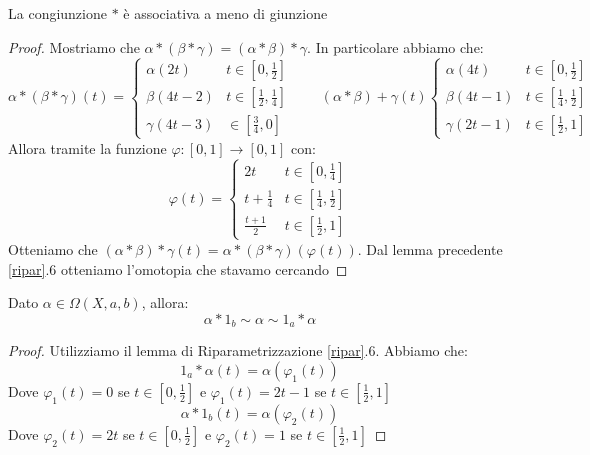 \documentclass[11pt,a4paper,twoside]{article}
\theoremstyle{definition}
\begin{document}
\begin{prop}{}{}\label{prop1}
	La congiunzione $*$ è associativa a meno di giunzione
\end{prop}

\begin{proof}
	Mostriamo che $\alpha*(\beta*\gamma) = (\alpha*\beta)*\gamma$. In particolare abbiamo che:
	\[
		\alpha*(\beta*\gamma)(t) =
		\begin{cases}
			\alpha(2t) & t \in [0,\frac 12]\\
			\beta(4t-2) & t \in [\frac 12, \frac 14]\\
			\gamma(4t-3) & \in[\frac 34 ,0]
		\end{cases} \qquad (\alpha*\beta)+\gamma(t)
		\begin{cases}
			\alpha(4t) & t \in [0,\frac 12]\\
			\beta(4t-1) & t \in [\frac 14, \frac 12]\\
			\gamma(2t-1) & t \in [\frac 12,1]
		\end{cases}
	\]
	Allora tramite la funzione $\varphi:[0,1] \to [0,1]$ con:
	\[
		\varphi(t) =
		\begin{cases}
			2t & t \in[0, \frac 14]\\
			t + \frac 14 & t \in [\frac 14, \frac 12]\\
			\frac{t+1}2 & t \in [\frac 12,1]
		\end{cases}
	\]
	Otteniamo che $(\alpha*\beta)*\gamma(t) = \alpha*(\beta*\gamma)(\varphi(t))$. Dal lemma precedente \ref{ripar}.6 otteniamo l'omotopia che stavamo cercando
\end{proof}

\begin{prop}{}{}\label{prop2}
	Dato $\alpha \in \Omega(X, a,b)$, allora:
	\[ \alpha*1_b \sim \alpha \sim 1_a*\alpha \]
\end{prop}
\begin{proof}
	Utilizziamo il lemma di Riparametrizzazione \ref{ripar}.6. Abbiamo che:
	\[ 1_a * \alpha(t) = \alpha(\varphi_1(t)) \]
	Dove $\varphi_1(t)=0$ se $t \in [0, \frac 12]$ e $\varphi_1(t) = 2t-1$ se $t \in [\frac 12,1]$
	\[ \alpha*1_b(t) = \alpha(\varphi_2(t)) \]
	Dove $\varphi_2(t) = 2t$ se $t \in [0,\frac 12]$ e $\varphi_2(t) = 1$ se $t \in [\frac 12, 1]$
\end{proof}
\end{document}
